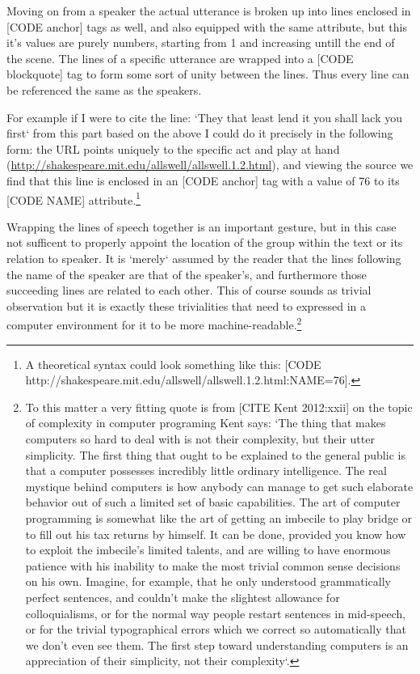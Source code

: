 \documentclass{article}
\begin{document}
Moving on from a speaker the actual utterance is broken up into lines enclosed in [CODE anchor] tags as well, and also equipped with the same attribute, but this it's values are purely numbers, starting from 1 and increasing untill the end of the scene. The lines of a specific utterance are wrapped into a [CODE blockquote] tag to form some sort of unity between the lines. Thus every line can be referenced the same as the speakers.

For example if I were to cite the line: `They that least lend it you shall lack you first` from this part based on the above I could do it precisely in the following form: the URL points uniquely to the specific act and play at hand (\url{http://shakespeare.mit.edu/allswell/allswell.1.2.html}), and viewing the source we find that this line is enclosed in an [CODE anchor] tag with a value of 76 to its [CODE NAME] attribute.\footnote{A theoretical syntax could look something like this: [CODE http://shakespeare.mit.edu/allswell/allswell.1.2.html:NAME=76].} 

Wrapping the lines of speech together is an important gesture, but in this case not sufficent to properly appoint the location of the group within the text or its relation to speaker. It is `merely` assumed by the reader that the lines following the name of the speaker are that of the speaker's, and furthermore those succeeding lines are related to each other. This of course sounds as trivial observation but it is exactly these trivialities that need to expressed in a computer environment for it to be more machine-readable.\footnote{To this matter a very fitting quote is from [CITE Kent 2012:xxii] on the topic of complexity in computer programing Kent says: `The thing that makes computers so hard to deal with is not their complexity, but their utter simplicity. The first thing that ought to be explained to the general public is that a computer possesses incredibly little ordinary intelligence. The real mystique behind computers is how anybody can manage to get such elaborate behavior out of such a limited set of basic capabilities. The art of computer programming is somewhat like the art of getting an imbecile to play bridge or to fill out his tax returns by himself. It can be done, provided you know how to exploit the imbecile’s limited talents, and are willing to have enormous patience with his inability to make the most trivial common sense decisions on his own. Imagine, for example, that he only understood grammatically perfect sentences, and couldn’t make the slightest allowance for colloquialisms, or for the normal way people restart sentences in mid-speech, or for the trivial typographical errors which we correct so automatically that we don’t even see them. The first step toward understanding computers is an appreciation of their simplicity, not their complexity`.}
\end{document}
